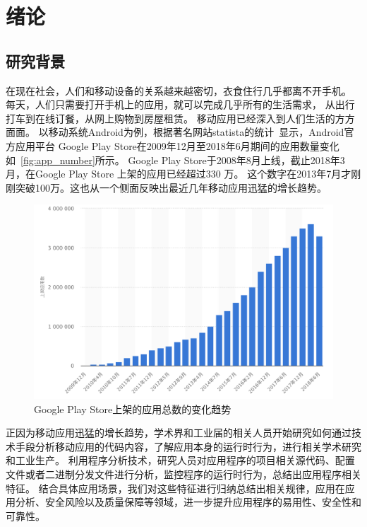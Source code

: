 \chapter {绪论}
\label{ch1}

\section{研究背景}

在现在社会，人们和移动设备的关系越来越密切，衣食住行几乎都离不开手机。
每天，人们只需要打开手机上的应用，就可以完成几乎所有的生活需求，
从出行打车到在线订餐，从网上购物到房屋租赁。
移动应用已经深入到人们生活的方方面面。
以移动系统Android为例，根据著名网站statista的统计~\cite{GoogleP55:online}显示，Android官方应用平台 Google Play Store在2009年12月至2018年6月期间的应用数量变化如~\autoref{fig:app_number}所示。
Google Play Store于2008年8月上线，截止2018年3月，在Google Play Store 上架的应用已经超过330 万。
这个数字在2013年7月才刚刚突破100万。这也从一个侧面反映出最近几年移动应用迅猛的增长趋势。

 \begin{figure}[hb]
	\centering
	\includegraphics[width=\textwidth]{./Figures/app-numbers.png}
	\caption{Google Play Store上架的应用总数的变化趋势}
	\label{fig:app_number}
\end{figure}


正因为移动应用迅猛的增长趋势，学术界和工业届的相关人员开始研究如何通过技术手段分析移动应用的代码内容，了解应用本身的运行时行为，进行相关学术研究和工业生产。
利用程序分析技术，研究人员对应用程序的项目相关源代码、配置文件或者二进制分发文件进行分析，监控程序的运行时行为，总结出应用程序相关特征。
结合具体应用场景，我们对这些特征进行归纳总结出相关规律，应用在应用分析、安全风险以及质量保障等领域，进一步提升应用程序的易用性、安全性和可靠性。

